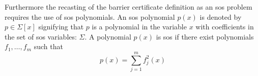 \vspace{-1mm}
Furthermore the recasting of the barrier certificate definition as an \gls{sos} problem requires the use of \gls{sos} polynomials. An \gls{sos} polynomial $p(x)$ is denoted by $p\in\Sigma[x]$ signifying that $p$ is a polynomial in the variable $x$ with coefficients in the set of \gls{sos} variables: $\Sigma$. A polynomial $p(x)$ is \gls{sos} if there exist polynomials $f_1,\dots,f_m$ such that \citep{bib:parrilo_sdp}
\vspace{-2mm}
\begin{equation}
p(x) = \sum_{j=1}^{m}f_j^2(x) \label{eq:sos_f_squared}
\end{equation}
%

